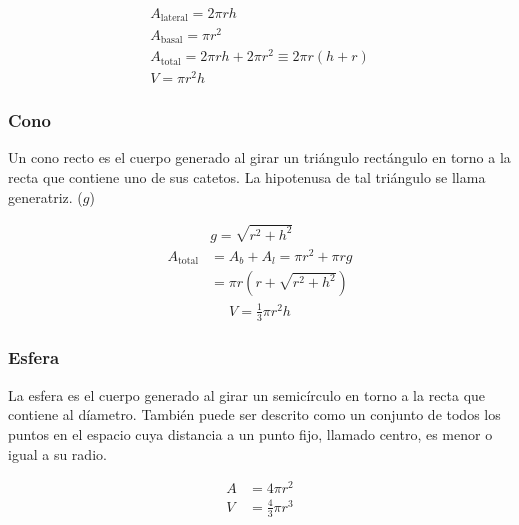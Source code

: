 \begin{gather*} 
    A_{\text{lateral}} = 2\pi rh\\
    A_{\text{basal}} = \pi r^2\\
    A_{\text{total}} = 2\pi rh + 2\pi r^2 \equiv 2\pi r(h+r)\\
    V = \pi r^2h
\end{gather*} 
\subsubsection{Cono}
Un cono recto es el cuerpo generado al girar un triángulo rectángulo en torno a la recta que contiene uno de sus catetos. La hipotenusa de tal triángulo se llama generatriz. ($g$)

\begin{equation*}
    \begin{split} 
        &g = \sqrt{r^2 + h^2}\\
        A_{\text{total}} &= A_b + A_l = \pi r^2 + \pi rg \\
        &= \pi r(r + \sqrt{r^2 + h^2})
    \end{split}
\end{equation*}
\begin{equation*}
    \begin{aligned} 
        V = \frac{1}{3}\pi r^2h
    \end{aligned}
\end{equation*}
\subsubsection{Esfera}
La esfera es el cuerpo generado al girar un semicírculo en torno a la recta que contiene al díametro. También puede ser descrito como un conjunto de todos los puntos en el espacio cuya distancia a un punto fijo, llamado centro, es menor o igual a su radio.

\begin{equation*}
    \begin{split} 
        A &= 4\pi r^2\\
        V &= \frac{4}{3} \pi r^3
    \end{split}
\end{equation*}